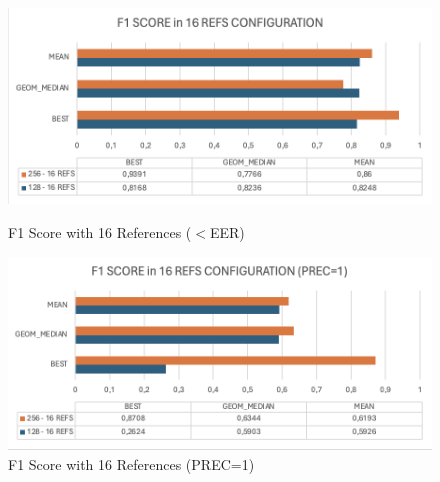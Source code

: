 \begin{figure}[!h]
    \begin{minipage}[b]{0.5\textwidth}
            \centering
            \includegraphics[width=\textwidth]{images/5.03 F1 Score 16 CNN.png}
            \caption{F1 Score with 16 References ($<$EER)}
            \label{fig:f1 score in configurations with 16 refs}
    \end{minipage}
    \hfill
    \begin{minipage}[b]{0.5\textwidth}
            \centering
            \includegraphics[width=\textwidth]{images/5.04 F1 Score 16 CNN prec1.png}
            \caption{F1 Score with 16 References (PREC=1)}
            \label{fig:f1 score in configurations with 16 refs (prec=1)}
    \end{minipage}
\end{figure}
